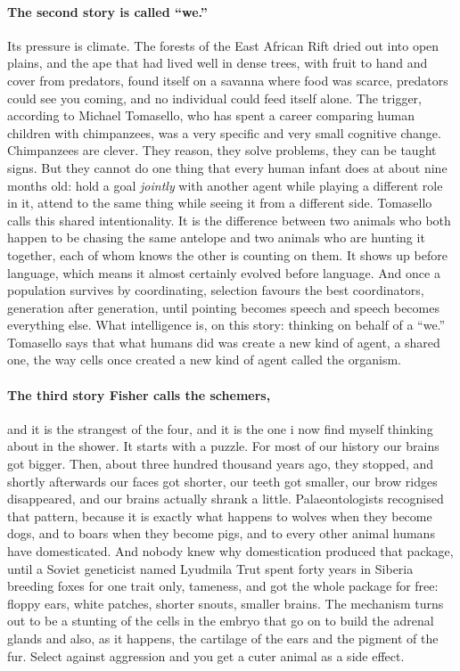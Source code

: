 \paragraph{The second story is called ``we.''} Its pressure is climate. The forests of the East African Rift dried out into open plains, and the ape that had lived well in dense trees, with fruit to hand and cover from predators, found itself on a savanna where food was scarce, predators could see you coming, and no individual could feed itself alone. The trigger, according to Michael Tomasello, who has spent a career comparing human children with chimpanzees, was a very specific and very small cognitive change. Chimpanzees are clever. They reason, they solve problems, they can be taught signs. But they cannot do one thing that every human infant does at about nine months old: hold a goal \emph{jointly} with another agent while playing a different role in it, attend to the same thing while seeing it from a different side. Tomasello calls this shared intentionality. It is the difference between two animals who both happen to be chasing the same antelope and two animals who are hunting it together, each of whom knows the other is counting on them. It shows up before language, which means it almost certainly evolved before language. And once a population survives by coordinating, selection favours the best coordinators, generation after generation, until pointing becomes speech and speech becomes everything else. What intelligence is, on this story: thinking on behalf of a ``we.'' Tomasello says that what humans did was create a new kind of agent, a shared one, the way cells once created a new kind of agent called the organism.

\paragraph{The third story Fisher calls the schemers,} and it is the strangest of the four, and it is the one i now find myself thinking about in the shower. It starts with a puzzle. For most of our history our brains got bigger. Then, about three hundred thousand years ago, they stopped, and shortly afterwards our faces got shorter, our teeth got smaller, our brow ridges disappeared, and our brains actually shrank a little. Palaeontologists recognised that pattern, because it is exactly what happens to wolves when they become dogs, and to boars when they become pigs, and to every other animal humans have domesticated. And nobody knew why domestication produced that package, until a Soviet geneticist named Lyudmila Trut spent forty years in Siberia breeding foxes for one trait only, tameness, and got the whole package for free: floppy ears, white patches, shorter snouts, smaller brains. The mechanism turns out to be a stunting of the cells in the embryo that go on to build the adrenal glands and also, as it happens, the cartilage of the ears and the pigment of the fur. Select against aggression and you get a cuter animal as a side effect.

